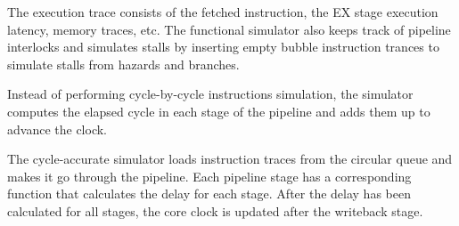 The execution trace consists of the fetched instruction, the EX stage execution latency, memory traces, etc. The functional simulator also keeps track of pipeline interlocks and simulates stalls by inserting empty bubble instruction trances to simulate stalls from hazards and branches.

Instead of performing cycle-by-cycle instructions simulation, the simulator computes the elapsed cycle in each stage of the pipeline and adds them up to advance the clock. 

The cycle-accurate simulator loads instruction traces from the circular queue and makes it go through the pipeline. Each pipeline stage has a corresponding function that calculates the delay for each stage. After the delay has been calculated for all stages, the core clock is updated after the writeback stage. 

